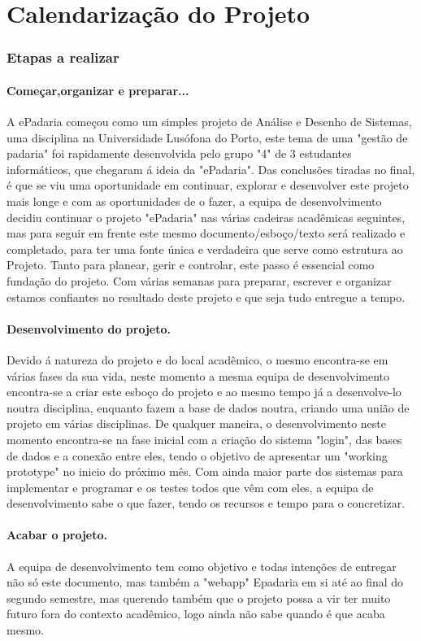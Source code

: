 \chapter{Calendarização do Projeto}
\label{calendarizacao}
\subsection{Etapas a realizar}
\subsubsection{	Começar,organizar e preparar...}
A ePadaria começou como um simples projeto de Análise e Desenho de Sistemas, uma disciplina na Universidade Lusófona do Porto, este tema de uma "gestão de padaria" foi rapidamente desenvolvida pelo grupo "4" de 3 estudantes informáticos, que chegaram á ideia da "ePadaria". Das conclusões tiradas no final, é que se viu uma oportunidade em continuar, explorar e desenvolver este projeto mais longe e com as oportunidades de o fazer, a equipa de desenvolvimento decidiu continuar o projeto "ePadaria" nas várias cadeiras acadêmicas seguintes, mas para seguir em frente este mesmo documento/esboço/texto será realizado e completado, para ter uma fonte única e verdadeira que serve como estrutura ao Projeto. Tanto para planear, gerir e controlar, este passo é essencial como fundação do projeto. Com várias semanas para preparar, escrever e organizar estamos confiantes no resultado deste projeto e que seja tudo entregue a tempo.
\subsubsection{Desenvolvimento do projeto.}
Devido á natureza do projeto e do local acadêmico, o mesmo encontra-se em várias fases da sua vida, neste momento a mesma equipa de desenvolvimento encontra-se a criar este esboço do projeto e ao mesmo tempo já a desenvolve-lo noutra disciplina, enquanto fazem a base de dados noutra, criando uma união de projeto em várias disciplinas. De qualquer maneira, o desenvolvimento neste momento encontra-se na fase inicial com a criação do sistema "login", das bases de dados e a conexão entre eles, tendo o objetivo de apresentar um "working prototype" no inicio do próximo mês. Com ainda maior parte dos sistemas para implementar e programar e os testes todos que vêm com eles, a equipa de desenvolvimento sabe o que fazer, tendo os recursos e tempo para o concretizar.
\subsubsection{Acabar o projeto.}
A equipa de desenvolvimento tem como objetivo e todas intenções de entregar não só este documento, mas também a "webapp" Epadaria em si até ao final do segundo semestre, mas querendo também que o projeto possa a vir ter muito futuro fora do contexto acadêmico, logo ainda não sabe quando é que acaba mesmo.
